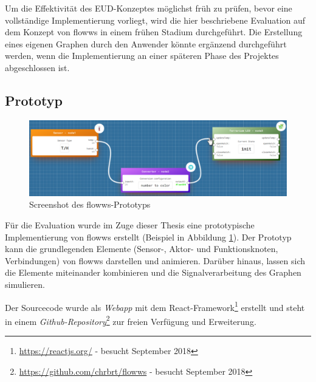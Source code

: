 Um die Effektivität des \ac{EUD}-Konzeptes möglichst früh zu prüfen, bevor eine vollständige Implementierung vorliegt, wird die hier beschriebene Evaluation auf dem Konzept von flowws in einem frühen Stadium durchgeführt. Die Erstellung eines eigenen Graphen durch den Anwender könnte ergänzend durchgeführt werden, wenn die Implementierung an einer späteren Phase des Projektes abgeschlossen ist. 

\subsection{Prototyp}

\begin{figure}[h]
  \centering
  \includegraphics[width=1\textwidth]{bilder/chapter5/screenshotflows.pdf}
  \caption{Screenshot des flowws-Prototyps}
  \label{fig:flowwsprototyp}
\end{figure}

Für die Evaluation wurde im Zuge dieser Thesis eine prototypische Implementierung von flowws erstellt (Beispiel in Abbildung \ref{fig:flowwsprototyp}). Der Prototyp kann die grundlegenden Elemente (Sensor-, Aktor- und Funktionsknoten, Verbindungen) von flowws darstellen und animieren. Darüber hinaus, lassen sich die Elemente miteinander kombinieren und die Signalverarbeitung des Graphen simulieren.

Der Sourcecode wurde als \textit{Webapp} mit dem React-Framework\footnote{\url{https://reactjs.org/} - besucht September 2018} erstellt und steht in einem \textit{Github-Repository}\footnote{\url{https://github.com/chrbrt/flowws} - besucht September 2018} zur freien Verfügung und Erweiterung.
